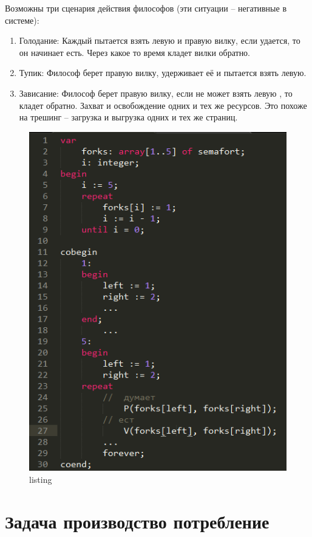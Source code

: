 Возможны три сценария действия философов (эти ситуации – негативные в системе):
\begin{enumerate}
    \item Голодание: Каждый пытается взять левую и правую вилку, если удается, то он начинает есть. Через какое то время кладет вилки обратно.
    \item Тупик: Философ берет правую вилку, удерживает её и пытается взять левую.
    \item Зависание: Философ берет правую вилку, если не может взять левую , то кладет обратно. Захват и освобождение одних и тех же ресурсов. Это похоже на трешинг – загрузка и выгрузка одних и тех же страниц.
\end{enumerate} 


\begin{figure}[H]
    \centering
    \includegraphics{listing/1.png}
    \caption{listing}
\end{figure}

\section{Задача производство потребление}

